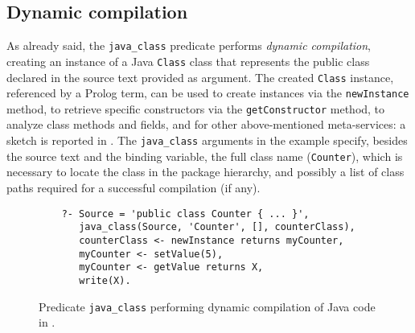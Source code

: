 \subsection{Dynamic compilation}

As already said, the \texttt{java\_class} predicate performs
\textit{dynamic compilation}, creating an instance of a Java
\texttt{Class} class that represents the public class declared in
the source text provided as argument.
%
The created \texttt{Class} instance, referenced by a Prolog term,
can be used to create instances via the \texttt{newInstance}
method, to retrieve specific constructors via the
\texttt{getConstructor} method, to analyze class methods and
fields, and for other above-mentioned meta-services: a sketch is
reported in .
%
The \texttt{java\_class} arguments in the example specify, besides
the source text and the binding variable, the full class name
(\texttt{Counter}), which is necessary to locate the class in the
package hierarchy, and possibly a list of class paths required
for a successful compilation (if any).

\begin{figure}
\caption{Predicate \texttt{java\_class} performing dynamic compilation of Java code in \tuprolog{}.
}
\begin{verbatim}
    ?- Source = 'public class Counter { ... }',
       java_class(Source, 'Counter', [], counterClass),
       counterClass <- newInstance returns myCounter,
       myCounter <- setValue(5),
       myCounter <- getValue returns X,
       write(X).
\end{verbatim}
\end{figure}

